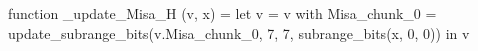 function _update_Misa_H (v, x) = let v = { v with Misa_chunk_0 = update_subrange_bits(v.Misa_chunk_0, 7, 7, subrange_bits(x, 0, 0)) } in
  v
